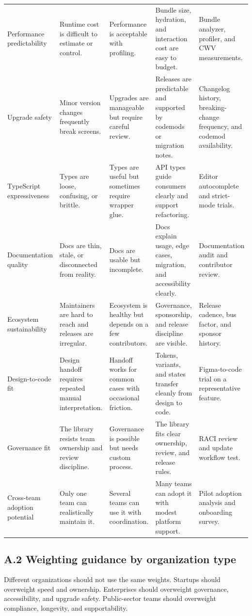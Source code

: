 \begin{longtable}{@{}p{}p{}p{}p{}p{}@{}}
Performance predictability & Runtime cost is difficult to estimate or control. & Performance is acceptable with profiling. & Bundle size, hydration, and interaction cost are easy to budget. & Bundle analyzer, profiler, and CWV measurements. \\
Upgrade safety & Minor version changes frequently break screens. & Upgrades are manageable but require careful review. & Releases are predictable and supported by codemods or migration notes. & Changelog history, breaking-change frequency, and codemod availability. \\
TypeScript expressiveness & Types are loose, confusing, or brittle. & Types are useful but sometimes require wrapper glue. & API types guide consumers clearly and support refactoring. & Editor autocomplete and strict-mode trials. \\
Documentation quality & Docs are thin, stale, or disconnected from reality. & Docs are usable but incomplete. & Docs explain usage, edge cases, migration, and accessibility clearly. & Documentation audit and contributor review. \\
Ecosystem sustainability & Maintainers are hard to reach and releases are irregular. & Ecosystem is healthy but depends on a few contributors. & Governance, sponsorship, and release discipline are visible. & Release cadence, bus factor, and sponsor history. \\
Design-to-code fit & Design handoff requires repeated manual interpretation. & Handoff works for common cases with occasional friction. & Tokens, variants, and states transfer cleanly from design to code. & Figma-to-code trial on a representative feature. \\
Governance fit & The library resists team ownership and review discipline. & Governance is possible but needs custom process. & The library fits clear ownership, review, and release rules. & RACI review and update workflow test. \\
Cross-team adoption potential & Only one team can realistically maintain it. & Several teams can use it with coordination. & Many teams can adopt it with modest platform support. & Pilot adoption analysis and onboarding survey. \\
\end{longtable}

\subsection*{A.2 Weighting guidance by organization type}
Different organizations should not use the same weights. Startups should overweight speed and ownership. Enterprises should overweight governance, accessibility, and upgrade safety. Public-sector teams should overweight compliance, longevity, and supportability.

